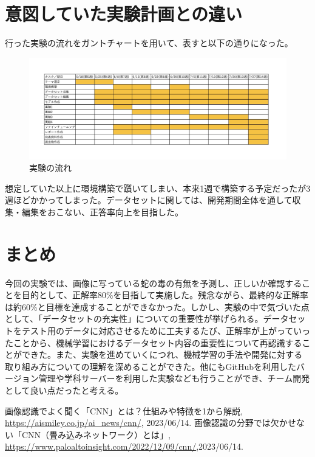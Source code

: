 \documentclass[a4paper, 11pt, titlepage]{jsarticle}
\begin{document}
\section{意図していた実験計画との違い}
行った実験の流れをガントチャートを用いて、表すと以下の通りになった。\par
\begin{figure}[htbp]
\begin{center}
\includegraphics[width=150mm]{G2_Ganttchart.jpeg}
\caption{実験の流れ}
\end{center}
\end{figure}
想定していた以上に環境構築で躓いてしまい、本来1週で構築する予定だったが3週ほどかかってしまった。データセットに関しては、開発期間全体を通して収集・編集をおこない、正答率向上を目指した。

\section{まとめ}
今回の実験では、画像に写っている蛇の毒の有無を予測し、正しいか確認することを目的として、正解率80\%を目指して実施した。残念ながら、最終的な正解率は約60\%と目標を達成することができなかった。しかし、実験の中で気づいた点として、「データセットの充実性」についての重要性が挙げられる。データセットをテスト用のデータに対応させるために工夫するたび、正解率が上がっていったことから、機械学習におけるデータセット内容の重要性について再認識することができた。また、実験を進めていくにつれ、機械学習の手法や開発に対する取り組み方についての理解を深めることができた。他にもGitHubを利用したバージョン管理や学科サーバーを利用した実験なども行うことができ、チーム開発として良い点だったと考える。

\begin{thebibliography}{n}
	画像認識でよく聞く「CNN」とは？仕組みや特徴を1から解説, \url{https://aismiley.co.jp/ai_news/cnn/}, 2023/06/14.
	画像認識の分野では欠かせない「CNN（畳み込みネットワーク）とは」, \url{https://www.paloaltoinsight.com/2022/12/09/cnn/},2023/06/14.
\end{thebibliography}
\end{document}
